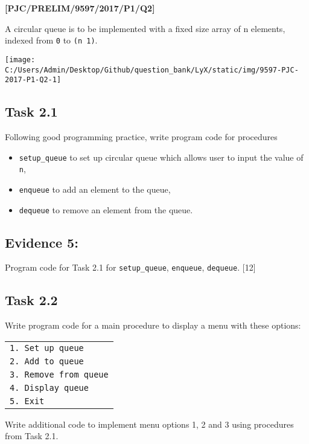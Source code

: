 \item \textbf{{[}PJC/PRELIM/9597/2017/P1/Q2{]} }

A circular queue is to be implemented with a fixed size array of n
elements, indexed from \texttt{0} to \texttt{(n \textendash{} 1)}.
\begin{center}
\texttt{[image: C:/Users/Admin/Desktop/Github/question\_bank/LyX/static/img/9597-PJC-2017-P1-Q2-1]}
\par\end{center}

\subsection*{Task 2.1 }

Following good programming practice, write program code for procedures 
\begin{itemize}
\item \texttt{setup\_queue} to set up circular queue which allows user to
input the value of \texttt{n}, 
\item \texttt{enqueue} to add an element to the queue,
\item \texttt{dequeue} to remove an element from the queue. 
\end{itemize}

\subsection*{Evidence 5: }

Program code for Task 2.1 for \texttt{setup\_queue}, \texttt{enqueue},
\texttt{dequeue}. \hfill{}{[}12{]}

\subsection*{Task 2.2 }

Write program code for a main procedure to display a menu with these
options: 
\noindent \begin{center}
\begin{tabular}{|l|}
\hline 
\texttt{1. Set up queue}\tabularnewline
\texttt{2. Add to queue}\tabularnewline
\texttt{3. Remove from queue}\tabularnewline
\texttt{4. Display queue }\tabularnewline
\texttt{5. Exit}\tabularnewline
\hline 
\end{tabular}
\par\end{center}

Write additional code to implement menu options 1, 2 and 3 using procedures
from Task 2.1. 

